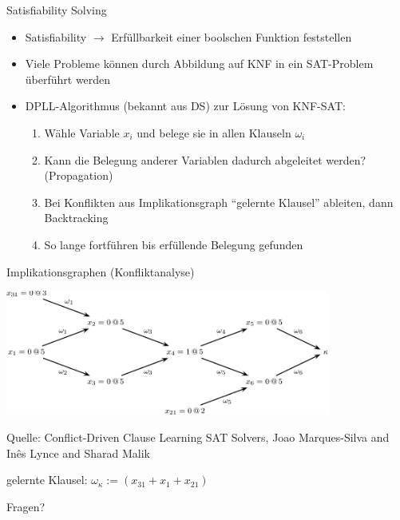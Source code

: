 \documentclass[
  german,            %
  aspectratio=169,    %
]{tumbeamer}
\begin{document}
\begin{frame}[fragile, c]{Satisfiability Solving}{}
  \begin{itemize}
    \item Satisfiability $\rightarrow$ Erfüllbarkeit einer boolschen Funktion feststellen
    \item Viele Probleme können durch Abbildung auf KNF in ein SAT-Problem überführt werden
    \item DPLL-Algorithmus (bekannt aus DS) zur Lösung von KNF-SAT:
          \begin{enumerate}
            \item Wähle Variable $x_i$ und belege sie in allen Klauseln $\omega_i$
            \item Kann die Belegung anderer Variablen dadurch abgeleitet werden? (Propagation)
            \item Bei Konflikten aus Implikationsgraph \enquote{gelernte Klausel} ableiten, dann Backtracking
            \item So lange fortführen bis erfüllende Belegung gefunden
          \end{enumerate}
  \end{itemize}
\end{frame}


\begin{frame}[c, fragile]{Implikationsgraphen (Konfliktanalyse)}{}

  \begin{center}
    \includegraphics[width=0.8\textwidth]{w12_sat.png}
  \end{center}
  \begin{center}
    \tiny{Quelle: Conflict-Driven Clause Learning SAT Solvers, Joao Marques-Silva and In{\^e}s Lynce and Sharad Malik}
  \end{center}
  gelernte Klausel: $\omega_\kappa:=(x_{31} + x_1 + x_{21})$
\end{frame}

\begin{frame}[c]{}{}
  \begin{center}
    \LARGE Fragen?
  \end{center}
\end{frame}
\end{document}
